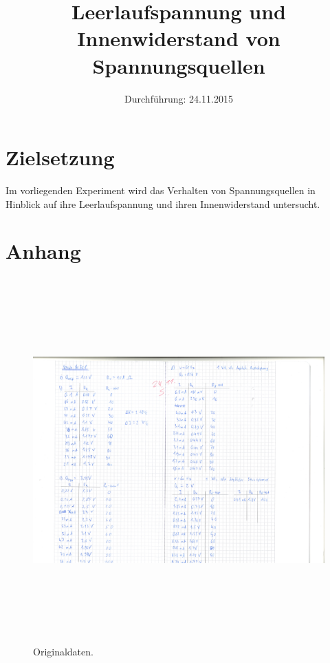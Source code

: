 

\subject{Versuchsprotokoll zum Versuch Nr. 301}
\title{Leerlaufspannung und Innenwiderstand von Spannungsquellen}
\date{
  Durchführung: 24.11.2015
}



\maketitle
\newpage

\section{Zielsetzung}

Im vorliegenden Experiment wird das Verhalten von Spannungsquellen in Hinblick auf ihre Leerlaufspannung und ihren Innenwiderstand untersucht.








\section{Anhang}
\begin{figure}[H]
  \centering
  \includegraphics[height=14cm]{hi_001.jpg}
  \caption{Originaldaten.}
  \label{fig:original1}
\end{figure}


\printbibliography


